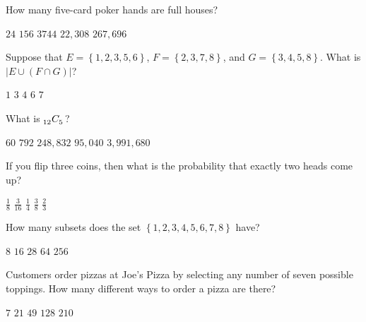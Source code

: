 \documentclass[answers,12pt]{exam}
\newcommand\ncr[2]{\tensor[_{#1}]C{_{#2}}}
\begin{document}
\begin{questions}
\question How many five-card poker hands are full houses?\\
\begin{oneparchoices}
\choice $24$ %
\choice $156$ %
\correctchoice $3744$
\choice $22,308$ %
\choice $267,696$ %
\end{oneparchoices}

\question Suppose that $E=\left\{1,2,3,5,6\right\}$,
$F=\left\{2,3,7,8\right\}$, and $G=\left\{3,4,5,8\right\}$.
What is $\left|E\cup\left(F\cap G\right)\right|$?\\
\begin{oneparchoices}
\choice $1$
\choice $3$ %
\choice $4$
\correctchoice $6$
\choice $7$
\end{oneparchoices}

\question What is $\ncr{12}{5}$?\\
\begin{oneparchoices}
\choice $60$ %
\correctchoice $792$
\choice $248,832$ %
\choice $95,040$ %
\choice $3,991,680$ %
\end{oneparchoices}

\question If you flip three coins, then what is the probability
that exactly two heads come up?\\
\begin{oneparchoices}
\choice $\frac{1}{8}$ %
\choice $\frac{3}{16}$ %
\choice $\frac{1}{4}$ %
\correctchoice $\frac{3}{8}$
\choice $\frac{2}{3}$ %
\end{oneparchoices}

\question How many subsets does the set
$\left\{1,2,3,4,5,6,7,8\right\}$ have?\\
\begin{oneparchoices}
\choice $8$ %
\choice $16$ %
\choice $28$ %
\choice $64$ %
\correctchoice $256$
\end{oneparchoices}

\question Customers order pizzas at Joe's Pizza
by selecting any number of seven possible toppings.
How many different ways to order a pizza are there?\\
\begin{oneparchoices}
\choice $7$ %
\choice $21$ %
\choice $49$ %
\correctchoice $128$
\choice $210$ %
\end{oneparchoices}
\newpage


\end{questions}
\end{document}
